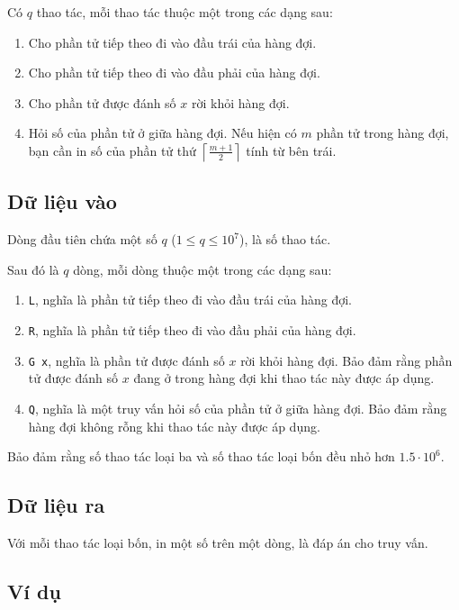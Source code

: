 \documentclass[11pt]{article}
\begin{document}
Có \(q\) thao tác, mỗi thao tác thuộc một trong các dạng sau:
\begin{enumerate}
  \item Cho phần tử tiếp theo đi vào đầu trái của hàng đợi.
  \item Cho phần tử tiếp theo đi vào đầu phải của hàng đợi.
  \item Cho phần tử được đánh số \(x\) rời khỏi hàng đợi.
  \item Hỏi số của phần tử ở giữa hàng đợi. Nếu hiện có \(m\) phần tử trong
  hàng đợi, bạn cần in số của phần tử thứ \(\left\lceil\frac{m+1}{2}\right\rceil\)
  tính từ bên trái.
\end{enumerate}

\subsection*{Dữ liệu vào}

Dòng đầu tiên chứa một số \(q\) (\(1\le q\le 10^7\)), là số thao tác.

Sau đó là \(q\) dòng, mỗi dòng thuộc một trong các dạng sau:
\begin{enumerate}
  \item \texttt{L}, nghĩa là phần tử tiếp theo đi vào đầu trái của hàng đợi.
  \item \texttt{R}, nghĩa là phần tử tiếp theo đi vào đầu phải của hàng đợi.
  \item \texttt{G x}, nghĩa là phần tử được đánh số \(x\) rời khỏi hàng đợi.
  Bảo đảm rằng phần tử được đánh số \(x\) đang ở trong hàng đợi khi thao tác
  này được áp dụng.
  \item \texttt{Q}, nghĩa là một truy vấn hỏi số của phần tử ở giữa hàng đợi.
  Bảo đảm rằng hàng đợi không rỗng khi thao tác này được áp dụng.
\end{enumerate}

Bảo đảm rằng số thao tác loại ba và số thao tác loại bốn đều nhỏ hơn
\(1.5\cdot 10^6\).

\subsection*{Dữ liệu ra}

Với mỗi thao tác loại bốn, in một số trên một dòng, là đáp án cho truy vấn.

\subsection*{Ví dụ}
\end{document}
